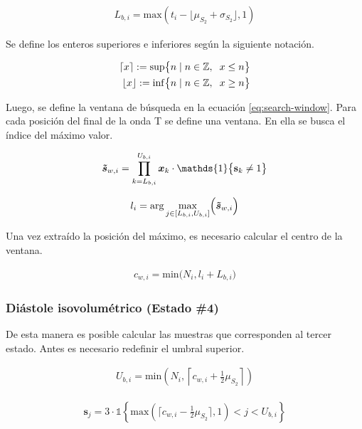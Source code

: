 \begin{align}
  L_{b,i} = \mathrm{max}(t_i-\lfloor \mu_{S_2} + \sigma_{S_2} \rfloor,1)
\end{align}

\indent Se define los enteros superiores e inferiores según la siguiente notación.

\begin{align*}
  \lceil x \rceil := \mathrm{sup}\big\{n \; | \; n \in \mathbb{Z}, \hspace{2mm} x \leq n\big\} \\
  \lfloor x \rfloor := \mathrm{inf}\big\{n \; | \; n \in \mathbb{Z}, \hspace{2mm} x \geq n\big\}
\end{align*}

\indent Luego, se define la ventana de búsqueda en la ecuación \ref{eq:search-window}. Para cada posición del final
de la onda T se define una ventana. En ella se busca el índice del máximo valor.

\begin{align}
  \label{eq:search-window}
  \bm{\Tilde{s}}_{w,i} = \prod_{k=L_{b,i}}^{U_{b,i}} \bm{x}_k \cdot \mathds{1}\big\{\mathbf{s}_k \neq 1\big\}
\end{align}

\begin{align}
  l_i = \arg \underset{j \in [L_{b,i},U_{b,i}]}{\mathrm{max}} \Big(\bm{\Tilde{s}}_{w,i}\Big)
\end{align}

\indent Una vez extraído la posición del máximo, es necesario calcular el centro de la ventana.

\begin{align}
  c_{w,i} = \mathrm{min}\Big(N_i,l_i+L_{b,i}\Big)
\end{align}

\subsubsection*{Diástole isovolumétrico (Estado \#4)}

\indent De esta manera es posible calcular las muestras que corresponden al tercer estado. Antes es necesario
redefinir el umbral superior.

\begin{align}
  U_{b,i} = \mathrm{min}\left(N_i, \left\lceil  c_{w,i} + \frac{1}{2}\mu_{S_2} \right\rceil \right)
\end{align}

\begin{align}
  \mathbf{s}_j = 3 \cdot \mathds{1}\left\{\mathrm{max}\left(\lceil c_{w,i}-\frac{1}{2}\mu_{S_2}\rceil, 1\right) < j
  < U_{b,i}\right\}
\end{align}

